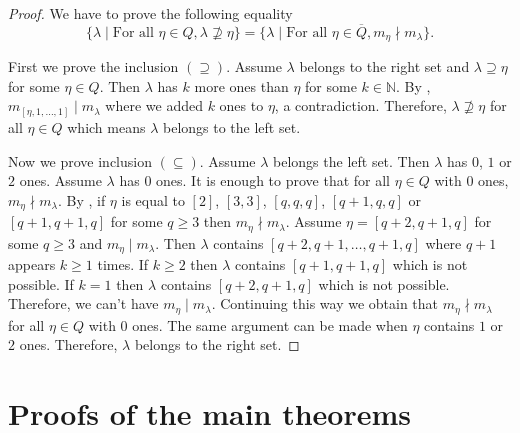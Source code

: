 \documentclass[12pt, a4paper]{article}
\theoremstyle{remark}
\begin{document}
\begin{proof}
  We have to prove the following equality
  \begin{equation*}
    \{\lambda \mid \text{For all }\eta\in Q, \lambda \nsupseteq \eta\} = \{\lambda \mid \text{For all } \eta\in \overline{Q}, m_\eta \nmid m_\lambda\}.
  \end{equation*}
  
  First we prove the inclusion $(\supseteq)$.
  Assume $\lambda$ belongs to the right set and $\lambda \supseteq \eta$ for some $\eta \in Q$.
  Then $\lambda$ has $k$ more ones than $\eta$ for some $k\in \mathbb{N}$.
  By , $m_{[\eta, 1, \dots, 1]} \mid m_\lambda$ where we added $k$ ones to $\eta$, a contradiction.
  Therefore, $\lambda \nsupseteq \eta$ for all $\eta \in Q$ which means $\lambda$ belongs to the left set.

  Now we prove inclusion $(\subseteq)$.
  Assume $\lambda$ belongs the left set.
  Then $\lambda$ has $0$, $1$ or $2$ ones.
  Assume $\lambda$ has $0$ ones.
  It is enough to prove that for all $\eta \in Q$ with $0$ ones, $m_\eta \nmid m_\lambda$.
  By , if $\eta$ is equal to $[2]$, $[3, 3]$, $[q, q, q]$, $[q + 1, q, q]$ or $[q + 1, q + 1, q]$ for some $q \ge 3$ then $m_\eta \nmid m_\lambda$.
  Assume $\eta = [q + 2, q + 1, q]$ for some $q \ge 3$ and $m_\eta \mid m_\lambda$.
  Then $\lambda$ contains $[q + 2, q + 1, \dots, q + 1, q]$ where $q + 1$ appears $k \ge 1$ times.
  If $k \ge 2$ then $\lambda$ contains $[q + 1, q + 1, q]$ which is not possible.
  If $k = 1$ then $\lambda$ contains $[q + 2, q + 1, q]$ which is not possible.
  Therefore, we can't have $m_\eta \mid m_\lambda$.
  Continuing this way we obtain that $m_\eta \nmid m_\lambda$ for all $\eta \in Q$ with $0$ ones.
  The same argument can be made when $\eta$ contains $1$ or $2$ ones.
  Therefore, $\lambda$ belongs to the right set.
\end{proof}

\section{Proofs of the main theorems}
\label{sec:proofs-main-theorems}
\end{document}
